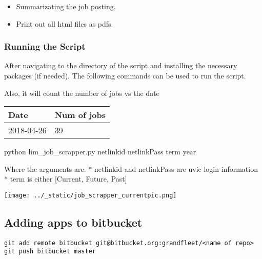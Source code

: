 \begin{itemize}

\item
  Summarizating the job posting.
\item
  Print out all html files as pdfs.
\end{itemize}


\subsubsection{Running the Script}\label{running-the-script}

After navigating to the directory of the script and installing the
necessary packages (if needed). The following commands can be used to
run the script.

Also, it will count the number of jobs vs the date

\begin{longtable}[]{@{}ll@{}}
\toprule
\begin{minipage}[b]{0.20\columnwidth}\raggedright
Date\strut
\end{minipage} & \begin{minipage}[b]{0.21\columnwidth}\raggedright
Num of jobs\strut
\end{minipage}\tabularnewline
\midrule
\endhead
\begin{minipage}[t]{0.20\columnwidth}\raggedright
2018-04-26\strut
\end{minipage} & \begin{minipage}[t]{0.21\columnwidth}\raggedright
39\strut
\end{minipage}\tabularnewline
\bottomrule
\end{longtable}

\begin{Shaded}
python  lim_job_scrapper.py netlinkid netlinkPass term year 
\end{Shaded}

Where the arguments are: * netlinkid and netlinkPass are uvic login
information * term is either {[}Current, Future, Past{]}

\texttt{[image: ../\_static/job\_scrapper\_currentpic.png]}


\subsection{Adding apps to bitbucket}\label{adding-apps-to-bitbucket}

\begin{verbatim}
git add remote bitbucket git@bitbucket.org:grandfleet/<name of repo>
git push bitbucket master
\end{verbatim}


